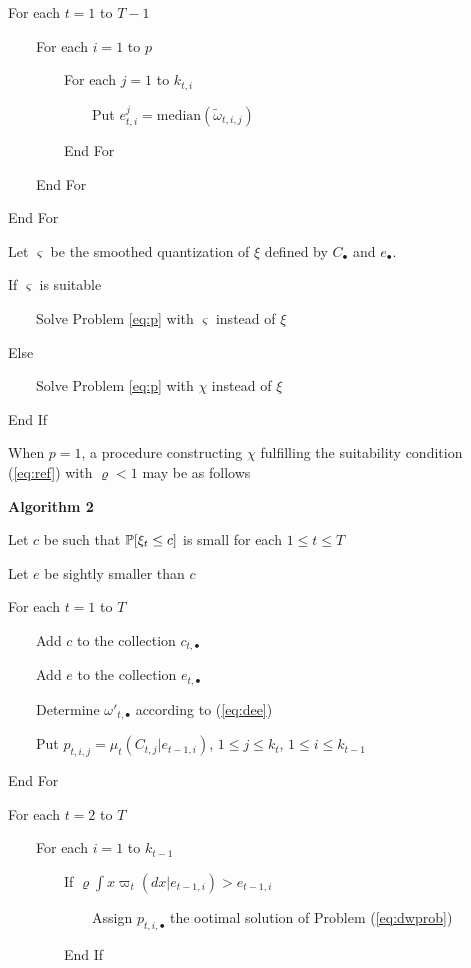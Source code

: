 \documentclass{article}              %
\begin{document}
For each $t=1$ to $T-1$

$\qquad$For each $i=1$ to $p$

$\qquad$$\qquad$For each $j=1$ to $k_{t,i}$

$\qquad$$\qquad$$\qquad$Put $e_{t,i}^{j}=\mathrm{median}(\tilde{\omega}_{t,i,j})$


$\qquad$$\qquad$End For

$\qquad$End For

End For

Let $\varsigma$ be the smoothed quantization of $\xi$ defined by $C_\bullet$ and $e_\bullet$.

If $\varsigma$ is suitable
	
$\qquad$Solve Problem \ref{eq:p} with $\varsigma$ instead of $\xi$

Else 

$\qquad$Solve Problem \ref{eq:p} with $\chi$ instead of $\xi$

End If

\bigskip 

\noindent When $p=1$, a procedure constructing $\chi$ fulfilling the suitability condition (\ref{eq:ref}) with  $\varrho<1$ may be as follows

\bigskip 

{\bf Algorithm 2}

\smallskip

Let $c$ be such that $\P[\xi_t\leq c]$ is small for each $1\leq t\leq T$

Let $e$ be sightly smaller than $c$

For each $t=1$ to $T$

$\qquad$Add $c$ to the collection $c_{t,\bullet}$ 

$\qquad$Add $e$ to the collection $e_{t,\bullet}$ 

$\qquad$Determine $\omega'_{t,\bullet}$ according to (\ref{eq:dee})

$\qquad$Put $p_{t,i,j}=\mu_t(C_{t,j}|e_{t-1,i})$, $1\leq j\leq k_t$, $1\leq i\leq k_{t-1}$

End For

For each $t=2$ to $T$

$\qquad$For each $i=1$ to $k_{t-1}$

$\qquad$$\qquad$If $\varrho\int x \varpi_{t}(dx|e_{t-1,i})> e_{t-1,i}$

$\qquad$$\qquad$$\qquad$Assign $p_{t,i,\bullet}$ the ootimal solution of Problem (\ref{eq:dwprob})

$\qquad$$\qquad$End If
\end{document}
